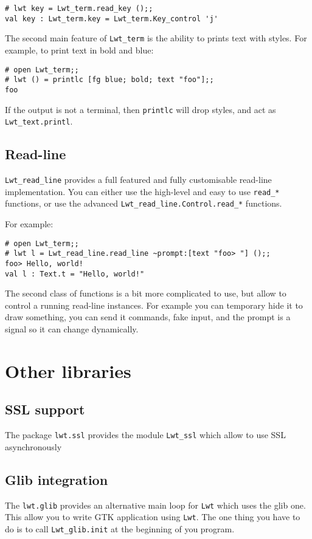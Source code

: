 \documentclass{article}
\newcommand{\lwt}{\texttt{Lwt}\xspace}
\begin{document}
\begin{verbatim}
# lwt key = Lwt_term.read_key ();;
val key : Lwt_term.key = Lwt_term.Key_control 'j'
\end{verbatim}

The second main feature of \texttt{Lwt\_term} is the ability to prints
text with styles. For example, to print text in bold and blue:

\begin{verbatim}
# open Lwt_term;;
# lwt () = printlc [fg blue; bold; text "foo"];;
foo
\end{verbatim}

If the output is not a terminal, then \texttt{printlc} will drop
styles, and act as \texttt{Lwt\_text.printl}.

\subsection{Read-line}

\texttt{Lwt\_read\_line} provides a full featured and fully
customisable read-line implementation. You can either use the
high-level and easy to use \texttt{read\_*} functions, or use the
advanced \texttt{Lwt\_read\_line.Control.read\_*} functions.

For example:

\begin{verbatim}
# open Lwt_term;;
# lwt l = Lwt_read_line.read_line ~prompt:[text "foo> "] ();;
foo> Hello, world!
val l : Text.t = "Hello, world!"
\end{verbatim}

The second class of functions is a bit more complicated to use, but
allow to control a running read-line instances. For example you can
temporary hide it to draw something, you can send it commands, fake
input, and the prompt is a signal so it can change dynamically.

\section{Other libraries}

\subsection{SSL support}

The package \texttt{lwt.ssl} provides the module \texttt{Lwt\_ssl}
which allow to use SSL asynchronously

\subsection{Glib integration}

The \texttt{lwt.glib} provides an alternative main loop for \lwt which
uses the glib one. This allow you to write GTK application using \lwt.
The one thing you have to do is to call \texttt{Lwt\_glib.init} at the
beginning of you program.
\end{document}
